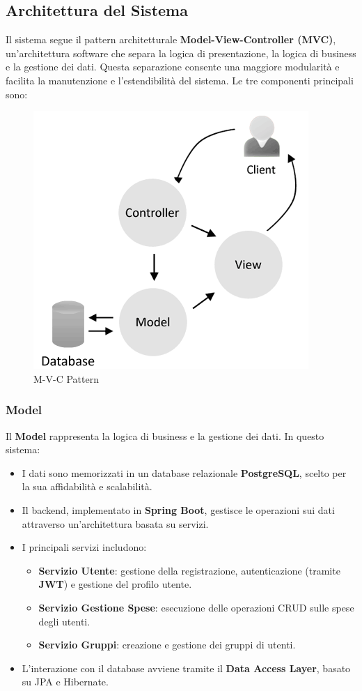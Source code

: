 \subsection{Architettura del Sistema}

Il sistema segue il pattern architetturale \textbf{Model-View-Controller (MVC)}, un'architettura software che separa la logica di presentazione, la logica di business e la gestione dei dati. Questa separazione consente una maggiore modularità e facilita la manutenzione e l'estendibilità del sistema. Le tre componenti principali sono:
\begin{figure}[h]
    \centering
    \includegraphics[scale=0.6]{images/mvc.png}
    \caption{M-V-C Pattern }
\end{figure}
\subsubsection{Model}
Il \textbf{Model} rappresenta la logica di business e la gestione dei dati. In questo sistema:
\begin{itemize}
    \item I dati sono memorizzati in un database relazionale \textbf{PostgreSQL}, scelto per la sua affidabilità e scalabilità.
    \item Il backend, implementato in \textbf{Spring Boot}, gestisce le operazioni sui dati attraverso un'architettura basata su servizi.
    \item I principali servizi includono:
    \begin{itemize}
        \item \textbf{Servizio Utente}: gestione della registrazione, autenticazione (tramite \textbf{JWT}) e gestione del profilo utente.
        \item \textbf{Servizio Gestione Spese}: esecuzione delle operazioni CRUD sulle spese degli utenti.
        \item \textbf{Servizio Gruppi}: creazione e gestione dei gruppi di utenti.
    \end{itemize}
    \item L'interazione con il database avviene tramite il \textbf{Data Access Layer}, basato su JPA e Hibernate.
\end{itemize}

